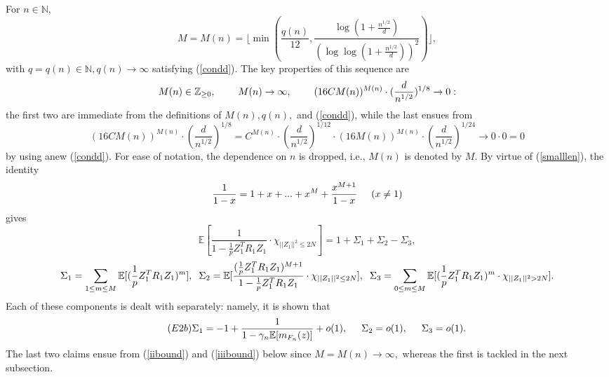 \documentclass{article}
\numberwithin{equation}{section}
\begin{document}
For \(n \in \mathbb{N},\)
\[M=M(n)=\lfloor \min{(\frac{q(n)}{12},\frac{\log{(1+\frac{n^{1/2}}{d})}}{(\log{\log{(1+\frac{n^{1/2}}{d})}})^2})} \rfloor,\]
with \(q=q(n) \in \mathbb{N}, q(n) \to \infty\) satisfying (\ref{condd}).
The key properties of this sequence are
\begin{equation}\label{propm}
    M(n) \in \mathbb{Z}_{\geq 0},  \hspace{0.8cm} M(n) \to \infty, \hspace{0.8cm} (16CM(n))^{M(n)} \cdot (\frac{d}{n^{1/2}})^{1/8} \to 0:
\end{equation}
the first two are immediate from the definitions of \(M(n),q(n),\) and (\ref{condd}), while the last ensues from
\[(16CM(n))^{M(n)} \cdot (\frac{d}{n^{1/2}})^{1/8}=C^{M(n)}\cdot (\frac{d}{n^{1/2}})^{1/12} \cdot (16M(n))^{M(n)} \cdot (\frac{d}{n^{1/2}})^{1/24} \to 0 \cdot 0=0\]
by using anew (\ref{condd}).
For ease of notation, the dependence on \(n\) is dropped, i.e., \(M(n)\) is denoted by \(M.\) By virtue of (\ref{smalllen}), the identity
\begin{equation}\label{powser}
    \frac{1}{1-x}=1+x+...+x^{M}+\frac{x^{M+1}}{1-x} \hspace{0.5cm} (x \ne 1)
\end{equation}
gives
\begin{equation}\tag{\(E2a\)}\label{bulk1}
    \mathbb{E}[\frac{1}{1-\frac{1}{p}Z_1^TR_1Z_1} \cdot \chi_{||Z_1||^2 \leq 2N}]=1+\Sigma_1+\Sigma_2-\Sigma_3,
\end{equation}
\[\Sigma_1=\sum_{1 \leq m \leq M}{\mathbb{E}[(\frac{1}{p}Z_1^TR_1Z_1)^m]}, \hspace{0.2cm} \Sigma_2=\mathbb{E}[\frac{(\frac{1}{p}Z_1^TR_1Z_1)^{M+1}}{1-\frac{1}{p}Z_1^TR_1Z_1} \cdot \chi_{||Z_1||^2 \leq 2N}], \hspace{0.2cm} \Sigma_3=\sum_{0 \leq m \leq M}{\mathbb{E}[(\frac{1}{p}Z_1^TR_1Z_1)^m\cdot \chi_{||Z_1||^2>2N}]}.\]
Each of these components is dealt with separately: namely, it is shown that
\begin{equation}\tag{\(E2b\)}\label{bulk2}
    \Sigma_1=-1+\frac{1}{1-\gamma_n\mathbb{E}[m_{F_n}(z)]}+o(1), \hspace{0.5cm} \Sigma_2=o(1), \hspace{0.5cm} \Sigma_3=o(1).
\end{equation}
The last two claims ensue from (\ref{iibound}) and (\ref{iiibound}) below since \(M=M(n) \to \infty,\) whereas the first is tackled in the next subsection.
\end{document}
